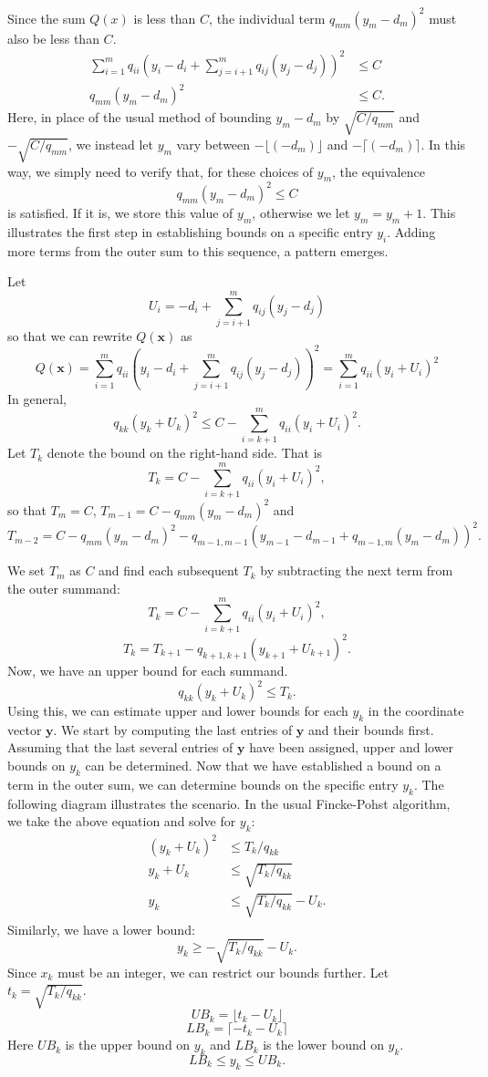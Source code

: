 Since the sum $Q(x)$ is less than $C$, the individual term $q_{mm}(y_m - d_m)^2$ must also be less than $C$.
\begin{align*}
\sum_{i=1}^m q_{ii}\left( y_i - d_i + \sum_{j=i+1}^m q_{ij}(y_j - d_j)\right)^2	 & \leq C \\
q_{mm}(y_m - d_m)^2 & \leq C.
\end{align*}
Here, in place of the usual method of bounding $y_m - d_m$ by $\sqrt{C/q_{mm}}$ and $-\sqrt{C/q_{mm}}$, we instead let $y_m$ vary between $-\lfloor(-d_m)\rfloor$ and $-\lceil(-d_m)\rceil$. In this way, we simply need to verify that, for these choices of $y_m$, the equivalence
\[q_{mm}(y_m - d_m)^2 \leq C\]
is satisfied. If it is, we store this value of $y_m$, otherwise we let $y_m = y_m + 1$. This illustrates the first step in establishing bounds on a specific entry $y_i$. Adding more terms from the outer sum to this sequence, a pattern emerges.

Let
\[U_i = -d_i + \sum_{j = i+1}^m q_{ij}(y_j - d_j)\]
so that we can rewrite $Q(\mathbf{x})$ as 
\[ Q(\mathbf{x}) = \sum_{i=1}^m q_{ii}\left( y_i - d_i + \sum_{j=i+1}^m q_{ij}(y_j - d_j)\right)^2 = \sum_{i=1}^m q_{ii}\left( y_i + U_i\right)^2\]
In general, 
\[q_{kk}(y_k + U_k)^2 \leq C - \sum_{i = k+1}^m q_{ii}(y_i + U_i)^2.\]
Let $T_k$ denote the bound on the right-hand side. That is
\[T_k = C - \sum_{i = k+1}^m q_{ii}(y_i + U_i)^2,\]
so that $T_m = C$, $T_{m-1} = C - q_{mm}(y_m - d_m)^2$ and 
\[T_{m-2} = C - q_{mm}(y_m - d_m)^2 - q_{m-1, m-1}\left(y_{m-1} - d_{m-1} + q_{m-1,m}(y_m-d_m)\right)^2.\]

We set $T_m$ as $C$ and find each subsequent $T_k$ by subtracting the next term from the outer summand:
\[T_k = C - \sum_{i = k+1}^m q_{ii}(y_i + U_i)^2,\]
\[T_k = T_{k+1} - q_{k+1,k+1}(y_{k+1} + U_{k+1})^2.\]
Now, we have an upper bound for each summand. 
\[q_{kk}(y_k + U_k)^2 \leq T_k.\]
Using this, we can estimate upper and lower bounds for each $y_k$ in the coordinate vector $\mathbf{y}$. We start by computing the last entries of $\mathbf{y}$ and their bounds first. Assuming that the last several entries of $\mathbf{y}$ have been assigned, upper and lower bounds on $y_k$ can be determined. Now that we have established a bound on a term in the outer sum, we can determine bounds on the specific entry $y_k$. The following diagram illustrates the scenario. In the usual Fincke-Pohst algorithm, we take the above equation and solve for $y_k$:
\begin{align*}
(y_k + U_k)^2	& \leq T_k/q_{kk}\\
	y_k + U_k	& \leq \sqrt{T_k/q_{kk}}\\
	y_k 		& \leq \sqrt{T_k/q_{kk}} - U_k.
\end{align*}
Similarly, we have a lower bound:
\[y_k \geq - \sqrt{T_k/q_{kk}} - U_k.\]
Since $x_k$ must be an integer, we can restrict our bounds further. Let $t_k = \sqrt{T_k/q_{kk}}$. 
\[UB_k = \lfloor t_k - U_k \rfloor\]
\[LB_k = \lceil-t_k - U_k\rceil\]
Here $UB_k$ is the upper bound on $y_k$ and $LB_k$ is the lower bound on $y_k$. 
\[LB_k \leq y_k \leq UB_k.\]

